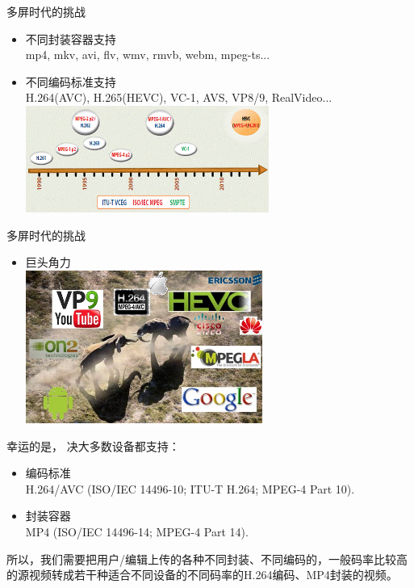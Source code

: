 \documentclass{beamer}
\begin{document}
\begin{frame}{多屏时代的挑战} 
\begin{itemize}
\item 不同封装容器支持\\ %
mp4, mkv, avi, flv, wmv, rmvb, webm, mpeg-ts... \pause
\item 不同编码标准支持\\ \pause
H.264(AVC), H.265(HEVC), VC-1, AVS, VP8/9, RealVideo...
\pause
\includegraphics[height=3.5cm]{fig/encoding_standards.png}\pause
\end{itemize}
\end{frame}
\begin{frame}{多屏时代的挑战} 
\begin{itemize}
\item 巨头角力\\ %
\includegraphics[height=5cm]{fig/competition.jpg}\pause
\end{itemize}
\end{frame}
\begin{frame}{幸运的是，}
\pause
决大多数设备都支持：
\pause
\begin{itemize}
\item 编码标准\\ \pause
H.264/AVC (ISO/IEC 14496-10;  ITU-T H.264; MPEG-4 Part 10).
\item 封装容器\\ \pause
MP4 (ISO/IEC 14496-14; MPEG-4 Part 14).
\end{itemize}
\pause
所以，我们需要把用户/编辑上传的各种不同封装、不同编码的，一般码率比较高的源视频转成若干种适合不同设备的不同码率的H.264编码、MP4封装的视频。
\end{frame}
\end{document}
